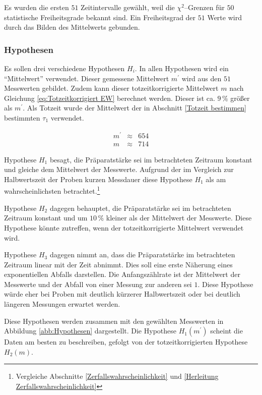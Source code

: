 \documentclass[12pt,a4paper]{scrartcl}
\numberwithin{equation}{section} %
\begin{document}
Es wurden die ersten $51$ Zeitintervalle gewählt, weil die $\chi^2$--Grenzen für $50$ statistische Freiheitsgrade bekannt sind. \cite{Kapur} Ein Freiheitsgrad der $51$ Werte wird durch das Bilden des Mittelwerts gebunden.

\subsubsection{Hypothesen}
\label{Hypothesen}
Es sollen drei verschiedene Hypothesen $H_i$. In allen Hypothesen wird ein ``Mittelwert'' verwendet. Dieser gemessene Mittelwert $m^\prime$ wird aus den $51$ Messwerten gebildet. Zudem kann dieser totzeitkorrigierte Mittelwert $m$ nach Gleichung \ref{eq:Totzeitkorrigiert EW} berechnet werden. Dieser ist ca. $9\,\%$ größer als $m^\prime$. Als Totzeit wurde der Mittelwert der in Abschnitt \ref{Totzeit bestimmen} bestimmten $\tau_1$ verwendet.

\begin{eqnarray}
	m^\prime &\approx& 654 \\
	m &\approx& 714
\end{eqnarray}

Hypothese $H_1$ besagt, die Präparatstärke sei im betrachteten Zeitraum konstant und gleiche dem Mittelwert der Messwerte. Aufgrund der im Vergleich zur Halbwertszeit der Proben kurzen Messdauer diese Hypothese $H_1$ als am wahrscheinlichsten betrachtet.\footnote{Vergleiche Abschnitte \ref{Zerfallswahrscheinlichkeit} und \ref{Herleitung Zerfallswahrscheinlichkeit}}

Hypothese $H_2$ dagegen behauptet, die Präparatstärke sei im betrachteten Zeitraum konstant und um $10\,\%$ kleiner als der Mittelwert der Messwerte. Diese Hypothese könnte zutreffen, wenn der totzeitkorrigierte Mittelwert verwendet wird.

Hypothese $H_3$ dagegen nimmt an, dass die Präparatstärke im betrachteten Zeitraum linear mit der Zeit abnimmt. Dies soll eine erste Näherung eines exponentiellen Abfalls darstellen. Die Anfangszählrate ist der Mittelwert der Messwerte und der Abfall von einer Messung zur anderen sei $1$. Diese Hypothese würde eher bei Proben mit deutlich kürzerer Halbwertszeit oder bei deutlich längeren Messungen erwartet werden.

Diese Hypothesen werden zusammen mit den gewählten Messwerten in Abbildung \ref{abb:Hypothesen} dargestellt. Die Hypothese $H_1(m^\prime)$ scheint die Daten am besten zu beschreiben, gefolgt von der totzeitkorrigierten Hypothese $H_2(m)$.
\end{document}
